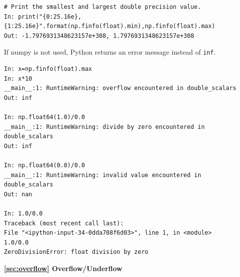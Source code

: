 \begin{example}
\small
\begin{mybox}
	\begin{verbatim}
# Print the smallest and largest double precision value.
In: print("{0:25.16e},{1:25.16e}".format(np.finfo(float).min),np.finfo(float).max)  
Out: -1.7976931348623157e+308, 1.7976931348623157e+308
   \end{verbatim}
\end{mybox}
\normalsize
\end{example}

\newpage

\begin{example}

If numpy is not used, Python returns an error message instead of 
\texttt{inf}.
\small
\begin{mybox}
	\begin{verbatim}
In: x=np.finfo(float).max
In: x*10
__main__:1: RuntimeWarning: overflow encountered in double_scalars
Out: inf

In: np.float64(1.0)/0.0
__main__:1: RuntimeWarning: divide by zero encountered in double_scalars
Out: inf

In: np.float64(0.0)/0.0
__main__:1: RuntimeWarning: invalid value encountered in double_scalars
Out: nan

In: 1.0/0.0
Traceback (most recent call last):
File "<ipython-input-34-0dda708f6d03>", line 1, in <module>
1.0/0.0
ZeroDivisionError: float division by zero
   \end{verbatim}
\normalsize
\end{mybox}
\end{example}

\textbf{\ref{sec:overflow} Overflow/Underflow}

